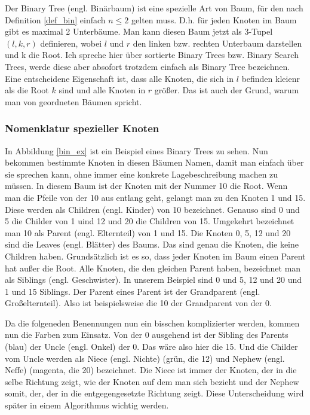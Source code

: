 \documentclass[11pt]{article}
\begin{document}
Der Binary Tree (engl. Binärbaum) ist eine spezielle Art von Baum, für den nach Definition \ref{def_bin} einfach $n \leq 2$ gelten muss. D.h. für jeden Knoten im Baum gibt es maximal 2 Unterbäume.
Man kann diesen Baum jetzt als 3-Tupel $(l, k, r)$ definieren, wobei $l$ und $r$ den linken bzw. rechten Unterbaum darstellen und k die Root. Ich spreche hier über sortierte Binary Trees bzw. Binary Search Trees, werde diese aber absofort trotzdem einfach als Binary Tree bezeichnen.
Eine entscheidene Eigenschaft ist, dass alle Knoten, die sich in $l$ befinden kleienr als die Root $k$ sind und alle Knoten in $r$ größer.
Das ist auch der Grund, warum man von geordneten Bäumen spricht. \cite[S. 147]{aad}

\subsubsection{Nomenklatur spezieller Knoten}

In Abbildung \ref{bin_ex} ist ein Beispiel eines Binary Trees zu sehen. Nun bekommen bestimmte Knoten in diesen Bäumen Namen, damit man einfach über sie sprechen kann, ohne immer
eine konkrete Lagebeschreibung machen zu müssen. In diesem Baum ist der Knoten mit der Nummer 10 die Root.
Wenn man die Pfeile von der 10 aus entlang geht, gelangt man zu den Knoten 1 und 15. Diese werden als Children (engl. Kinder) von 10 bezeichnet. Genauso sind 0 und 5 die Childer von 1 uind 12 und 20 die Children von 15.
Umgekehrt bezeichnet man 10 als Parent (engl. Elternteil) von 1 und 15. 
Die Knoten 0, 5, 12 und 20 sind die Leaves (engl. Blätter) des Baums. Das sind genau die Knoten, die keine Children haben.
Grundsätzlich ist es so, dass jeder Knoten im Baum einen Parent hat außer die Root.
Alle Knoten, die den gleichen Parent haben, bezeichnet man als Siblings (engl. Geschwister). In unserem Beispiel sind 0 und 5, 12 und 20 und 1 und 15 Siblings. 
Der Parent eines Parent ist der Grandparent (engl. Großelternteil). Also ist beispielsweise die 10 der Grandparent von der 0.
\cite[S.311]{aop}

Da die folgeneden Benennungen nun ein bisschen komplizierter werden, kommen nun die Farben zum Einsatz. Von der 0 ausgehend ist der Sibling des Parents (blau) der Uncle (engl. Onkel) der 0. Das wäre also hier die 15.
Und die Childer vom Uncle werden als Niece (engl. Nichte) (grün, die 12) und Nephew (engl. Neffe) (magenta, die 20) bezeichnet. Die Niece ist immer der Knoten, der in die selbe Richtung zeigt, wie der Knoten auf dem man sich bezieht und der Nephew somit, der, der in die entgegengesetzte Richtung zeigt.
Diese Unterscheidung wird später in einem Algorithmus wichtig werden.
\end{document}
